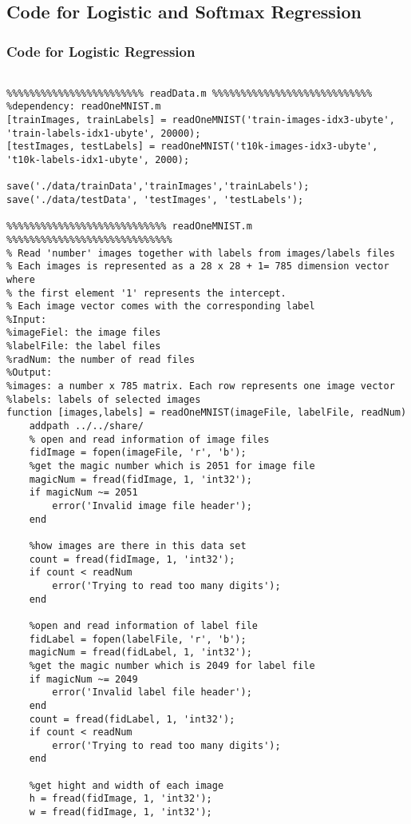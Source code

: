 \documentclass[12pt]{article} %
\theoremstyle{definition}\newtheorem{law}{Law}
\theoremstyle{plain}\newtheorem{jury}[law]{Jury}
\theoremstyle{remark}\newtheorem{juu}{Juu}
\theoremstyle{definition}\newtheorem{kuu}[law]{Kuu}
\theoremstyle{definition}\newtheorem{muu}{Muu}[section]
\theoremstyle{definition}\newtheorem{honoluu}{Honoluu}[section]
\theoremstyle{definition}\newtheorem{konoluu}[muu]{Konoluu}
\begin{document}
\subsection{Code for Logistic and Softmax Regression}
\subsubsection{Code for Logistic Regression}
\begin{lstlisting}

%%%%%%%%%%%%%%%%%%%%%%%% readData.m %%%%%%%%%%%%%%%%%%%%%%%%%%%%
%dependency: readOneMNIST.m
[trainImages, trainLabels] = readOneMNIST('train-images-idx3-ubyte', 'train-labels-idx1-ubyte', 20000);
[testImages, testLabels] = readOneMNIST('t10k-images-idx3-ubyte', 't10k-labels-idx1-ubyte', 2000);

save('./data/trainData','trainImages','trainLabels');
save('./data/testData', 'testImages', 'testLabels');

%%%%%%%%%%%%%%%%%%%%%%%%%%%% readOneMNIST.m %%%%%%%%%%%%%%%%%%%%%%%%%%%%%
% Read 'number' images together with labels from images/labels files
% Each images is represented as a 28 x 28 + 1= 785 dimension vector where
% the first element '1' represents the intercept.
% Each image vector comes with the corresponding label
%Input:
%imageFiel: the image files
%labelFile: the label files
%radNum: the number of read files
%Output:
%images: a number x 785 matrix. Each row represents one image vector
%labels: labels of selected images
function [images,labels] = readOneMNIST(imageFile, labelFile, readNum)
    addpath ../../share/
    % open and read information of image files
    fidImage = fopen(imageFile, 'r', 'b');
    %get the magic number which is 2051 for image file
    magicNum = fread(fidImage, 1, 'int32');
    if magicNum ~= 2051
        error('Invalid image file header');
    end
    
    %how images are there in this data set
    count = fread(fidImage, 1, 'int32');
    if count < readNum
        error('Trying to read too many digits');
    end
    
    %open and read information of label file
    fidLabel = fopen(labelFile, 'r', 'b');
    magicNum = fread(fidLabel, 1, 'int32');
    %get the magic number which is 2049 for label file
    if magicNum ~= 2049
        error('Invalid label file header');
    end
    count = fread(fidLabel, 1, 'int32');
    if count < readNum
        error('Trying to read too many digits');
    end
    
    %get hight and width of each image
    h = fread(fidImage, 1, 'int32');
    w = fread(fidImage, 1, 'int32');
    

\end{lstlisting}
\end{document}
